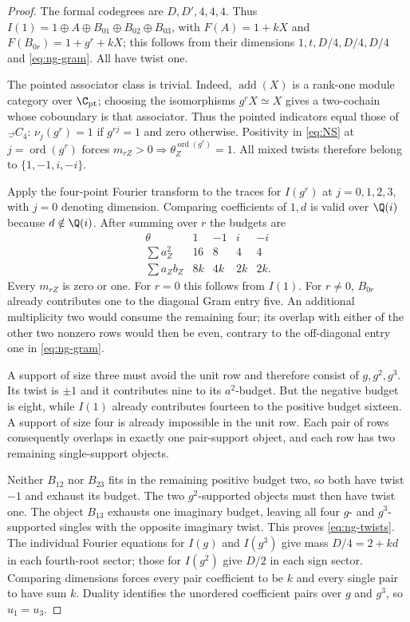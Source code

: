 \begin{proof}
The formal codegrees are $D,D',4,4,4$. Thus
$I(1)=1\oplus A\oplus B_{01}\oplus B_{02}\oplus B_{03}$, with
$F(A)=1+kX$ and $F(B_{0r})=1+g^r+kX$; this follows from their dimensions
$1,t,D/4,D/4,D/4$ and \eqref{eq:ng-gram}. All have twist one.

The pointed associator class is trivial. Indeed, $\operatorname{add}(X)$
is a rank-one module category over $\C_{\mathrm{pt}}$; choosing the
isomorphisms $g^rX\simeq X$ gives a two-cochain whose coboundary is that
associator. Thus the pointed indicators equal those of $\Vec_{C_4}$:
$\nu_j(g^r)=1$ if $g^{rj}=1$ and zero otherwise. Positivity in
\eqref{eq:NS} at $j=\operatorname{ord}(g^r)$ forces
$m_{rZ}>0\Rightarrow\theta_Z^{\operatorname{ord}(g^r)}=1$.
All mixed twists therefore belong to $\{1,-1,i,-i\}$.

Apply the four-point Fourier transform to the traces for $I(g^r)$ at
$j=0,1,2,3$, with $j=0$ denoting dimension. Comparing coefficients of
$1,d$ is valid over $\Q(i)$ because $d\notin\Q(i)$. After summing over
$r$ the budgets are
\begin{equation}\label{eq:ng-budgets}
\begin{array}{c|rrrr}
 \theta&1&-1&i&-i\\\hline
 \sum a_Z^2&16&8&4&4\\
 \sum a_Zb_Z&8k&4k&2k&2k.
\end{array}
\end{equation}
Every $m_{rZ}$ is zero or one. For $r=0$ this follows from $I(1)$.
For $r\ne0$, $B_{0r}$ already contributes one to the diagonal Gram
entry five. An additional multiplicity two would consume the remaining
four; its overlap with either of the other two nonzero rows would then
be even, contrary to the off-diagonal entry one in \eqref{eq:ng-gram}.

A support of size three must avoid the unit row and therefore consist
of $g,g^2,g^3$. Its twist is $\pm1$ and it contributes nine to its
$a^2$-budget. But the negative budget is eight, while $I(1)$ already
contributes fourteen to the positive budget sixteen. A support of size
four is already impossible in the unit row. Each pair of rows
consequently overlaps in exactly one pair-support object, and each row
has two remaining single-support objects.

Neither $B_{12}$ nor $B_{23}$ fits in the remaining positive budget two,
so both have twist $-1$ and exhaust its budget. The two $g^2$-supported
objects must then have twist one. The object $B_{13}$ exhausts one
imaginary budget, leaving all four $g$- and $g^3$-supported singles with
the opposite imaginary twist. This proves \eqref{eq:ng-twists}.
The individual Fourier equations for $I(g)$ and $I(g^3)$ give mass
$D/4=2+kd$ in each fourth-root sector; those for $I(g^2)$ give $D/2$
in each sign sector. Comparing dimensions forces every pair coefficient
to be $k$ and every single pair to have sum $k$. Duality identifies the
unordered coefficient pairs over $g$ and $g^3$, so $u_1=u_3$.


\end{proof}
